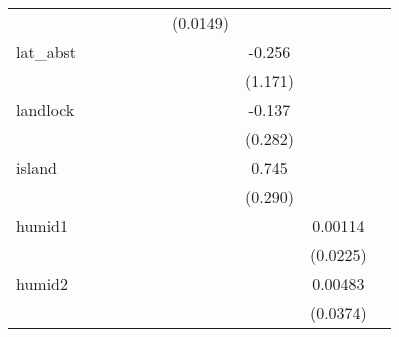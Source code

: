 {\begin{tabular}{l*{9}{c}}
            &                     &                     &                     &                     &                     &    (0.0149)         &                     &                     &                     \\
[1em]
lat\_abst    &                     &                     &                     &                     &                     &                     &      -0.256         &                     &                     \\
            &                     &                     &                     &                     &                     &                     &     (1.171)         &                     &                     \\
[1em]
landlock    &                     &                     &                     &                     &                     &                     &      -0.137         &                     &                     \\
            &                     &                     &                     &                     &                     &                     &     (0.282)         &                     &                     \\
[1em]
island      &                     &                     &                     &                     &                     &                     &       0.745\sym{**} &                     &                     \\
            &                     &                     &                     &                     &                     &                     &     (0.290)         &                     &                     \\
[1em]
humid1      &                     &                     &                     &                     &                     &                     &                     &     0.00114         &                     \\
            &                     &                     &                     &                     &                     &                     &                     &    (0.0225)         &                     \\
[1em]
humid2      &                     &                     &                     &                     &                     &                     &                     &     0.00483         &                     \\
            &                     &                     &                     &                     &                     &                     &                     &    (0.0374)         &                     \\

\end{tabular}}
